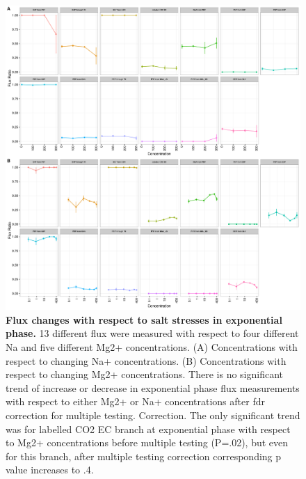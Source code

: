 \documentclass[a4paper]{article}
\begin{document}
\clearpage
\begin{figure}[!htb]
	\includegraphics[width=1\textwidth]{../supplementary_figures/figS2_FluxExp.pdf}
	\caption[Flux Exponential]
	{\textbf{Flux changes with respect to salt stresses in exponential phase.} 13 different flux were measured with respect to four different Na and five different Mg2+ concentrations. (A) Concentrations with respect to changing Na+ concentrations. (B) Concentrations with respect to changing Mg2+ concentrations. There is no significant trend of increase or decrease in exponential phase flux measurements with respect to either Mg2+ or Na+ concentrations after fdr correction for multiple testing. Correction. The only significant trend was for labelled CO2 EC branch at exponential phase with respect to Mg2+ concentrations before multiple testing (P=.02), but even for this branch, after multiple testing correction corresponding p value increases to .4.}
\end{figure}
\end{document}
